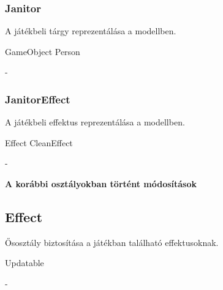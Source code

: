 \subsubsection{Janitor}
\begin{class-template-responsibility}
    A játékbeli tárgy reprezentálása a modellben.
\end{class-template-responsibility}
\begin{class-template-baseclass}
    GameObject \baseclass Person
\end{class-template-baseclass}
\begin{class-template-method}
    -   
\end{class-template-method}

\subsubsection{JanitorEffect}
\begin{class-template-responsibility}
    A játékbeli effektus reprezentálása a modellben.
\end{class-template-responsibility}
\begin{class-template-baseclass}
    Effect \baseclass CleanEffect
\end{class-template-baseclass}
\begin{class-template-method}
    -
\end{class-template-method}

\textbf{A korábbi osztályokban történt módosítások}

\subsection{Effect}
\begin{class-template-responsibility}
    Ősosztály biztosítása a játékban található effektusoknak.
\end{class-template-responsibility}
\begin{class-template-interface}
    Updatable
\end{class-template-interface}
\begin{class-template-baseclass}
    -
\end{class-template-baseclass}
\begin{class-template-attribute}
\end{class-template-attribute}
\begin{class-template-method}
\end{class-template-method}

